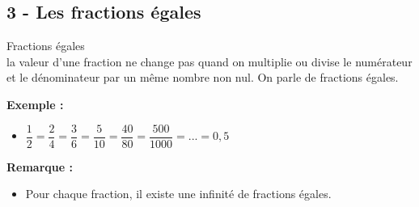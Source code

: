 \subsection*{3 - Les fractions égales}

\begin{Definition}{Fractions égales}\\
  la valeur d'une fraction ne change pas quand on multiplie ou divise le numérateur et le dénominateur par un même nombre non nul. On parle de fractions égales.
\end{Definition}

\textbf{Exemple : }

\begin{itemize}[label={$\bullet$}]
  \item $\dfrac{1}{2} = \dfrac{2}{4} = \dfrac{3}{6} = \dfrac{5}{10} = \dfrac{40}{80} = \dfrac{500}{1000} = ... = 0,5$ 
\end{itemize}

\textbf{Remarque : }

\begin{itemize}[label={$\bullet$}]
  \item Pour chaque fraction, il existe une infinité de fractions égales.
\end{itemize}

